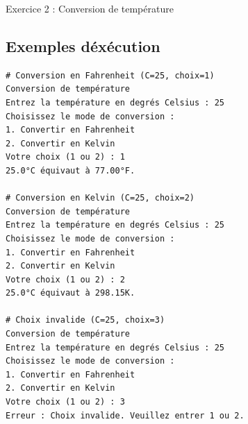 \documentclass[10pt,a4paper]{article}
\begin{document}
\begin{exoBox}{Exercice 2 : Conversion de température}
\subsection*{Exemples d\'exécution}
\begin{verbatim}
# Conversion en Fahrenheit (C=25, choix=1)
Conversion de température
Entrez la température en degrés Celsius : 25
Choisissez le mode de conversion :
1. Convertir en Fahrenheit
2. Convertir en Kelvin
Votre choix (1 ou 2) : 1
25.0°C équivaut à 77.00°F.

# Conversion en Kelvin (C=25, choix=2)
Conversion de température
Entrez la température en degrés Celsius : 25
Choisissez le mode de conversion :
1. Convertir en Fahrenheit
2. Convertir en Kelvin
Votre choix (1 ou 2) : 2
25.0°C équivaut à 298.15K.

# Choix invalide (C=25, choix=3)
Conversion de température
Entrez la température en degrés Celsius : 25
Choisissez le mode de conversion :
1. Convertir en Fahrenheit
2. Convertir en Kelvin
Votre choix (1 ou 2) : 3
Erreur : Choix invalide. Veuillez entrer 1 ou 2.

\end{verbatim}
\end{exoBox}
\vspace{0.5cm}
\end{document}
